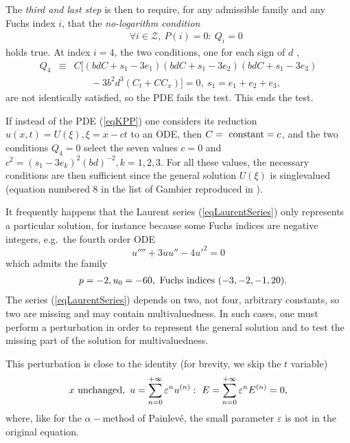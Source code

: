 \documentclass[10pt]{article}
\begin{document}
The \textit{third and last step} is then to require,
for any admissible family and any Fuchs index $i$,
that the \textit{no-logarithm condition}
\begin{eqnarray}
& &
\forall i \in {\mathcal Z},\
P(i)=0 :\
Q_i=0
\label{eqConditionQ}
\end{eqnarray}
holds true.
At index $i=4$, the two conditions,
one for each sign of $d$ \cite{Conte1988},
\begin{eqnarray}
Q_4 & \equiv &
 C
 [(b d C + s_1 - 3 e_1)(b d C + s_1 - 3 e_2) (b d C + s_1 - 3 e_3)
\nonumber
\\
& &
\phantom{xxx} - 3 b^2 d^3 (C_t + C C_x)]
=0,\
s_1=e_1+e_2+e_3,
\label{eqKPPQ4}
\end{eqnarray}
are not identically satisfied, so the PDE fails the test.
This ends the test.

If instead of the PDE (\ref{eqKPP}) one considers its reduction
$u(x,t)=U(\xi), \xi=x-ct$ to an ODE,
then $C=\hbox{ constant}=c$,
and the two conditions $Q_4=0$ select the seven values
$c=0$ and $c^2=(s_1-3 e_k)^2 (b d)^{-2},k=1,2,3$.
For all these values, the necessary conditions are then sufficient since the
general solution $U(\xi)$ is singlevalued
(equation numbered 8 in the list of Gambier \cite{GambierThese}
reproduced in \cite{Ince}).

It frequently happens that the Laurent series (\ref{eqLaurentSeries}) 
only represents a particular solution,
for instance because some Fuchs indices are negative integers,
e.g.~the fourth order ODE \cite[p.~79]{BureauMII} 
\begin{equation}
 u'''' + 3 u u'' - 4 u'^2 = 0
\label{eqBureauOrder4}
\end{equation}
which admits the family
\begin{eqnarray}
& &
p=-2, u_0=-60, \hbox{ Fuchs indices } (-3,-2,-1,20).
\end{eqnarray}
The series (\ref{eqLaurentSeries}) depends on two, not four,
arbitrary constants, so two are missing and may contain multivaluedness.
In such cases,
one must perform a perturbation in order to represent the general solution
and to test the missing part of the solution for multivaluedness.

This perturbation \cite{CFP1993} is close to the identity
(for brevity, we skip the $t$ variable)
\begin{equation}
\label{eqPerturbu}
 x \hbox{ unchanged},\
 { u}= \sum_{n=0}^{+ \infty} \varepsilon^n { u}^{(n)}:\
 { E}= \sum_{n=0}^{+ \infty} \varepsilon^n { E}^{(n)}=0,
\end{equation}
where, like for the $\alpha-$method of Painlev\'e, 
the small parameter $\varepsilon$ is not in the original equation.
\end{document}
